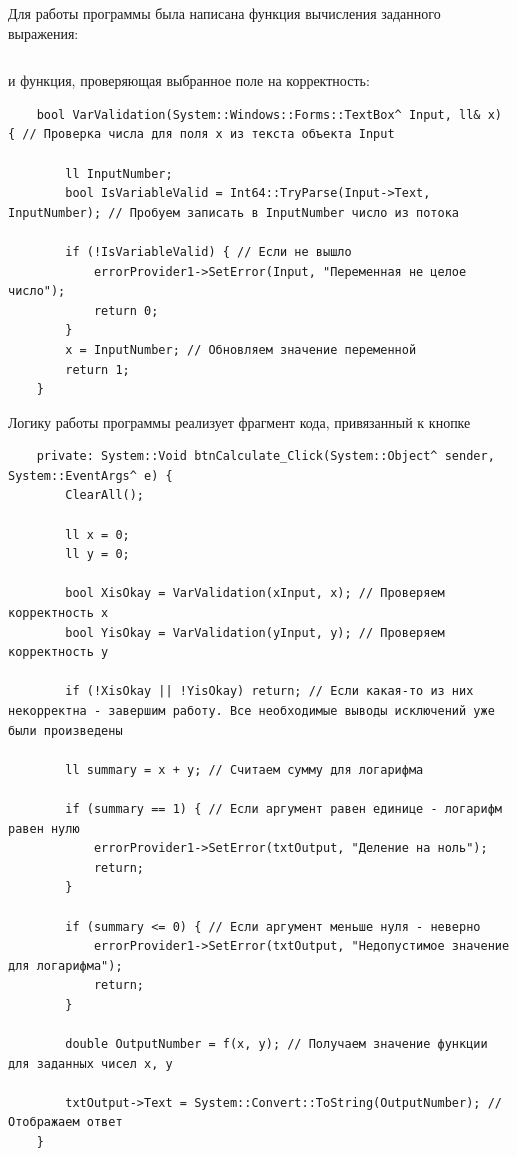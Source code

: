 Для работы программы была написана функция вычисления заданного выражения:
\inputminted[fontsize=\small, breaklines=true, style=bw, linenos]{cpp}{task2/f.h}
и функция, проверяющая выбранное поле на корректность\cite{MS, MS1}:
\begin{verbatim}
    bool VarValidation(System::Windows::Forms::TextBox^ Input, ll& x) { // Проверка числа для поля x из текста объекта Input
		
		ll InputNumber;
		bool IsVariableValid = Int64::TryParse(Input->Text, InputNumber); // Пробуем записать в InputNumber число из потока
		
		if (!IsVariableValid) { // Если не вышло
			errorProvider1->SetError(Input, "Переменная не целое число");
			return 0;
		}
		x = InputNumber; // Обновляем значение переменной
		return 1;
    }
\end{verbatim}
Логику работы программы реализует фрагмент кода, привязанный к кнопке
\begin{verbatim}
	private: System::Void btnCalculate_Click(System::Object^ sender, System::EventArgs^ e) {
		ClearAll();

		ll x = 0;
		ll y = 0;

		bool XisOkay = VarValidation(xInput, x); // Проверяем корректность x
		bool YisOkay = VarValidation(yInput, y); // Проверяем корректность y

		if (!XisOkay || !YisOkay) return; // Если какая-то из них некорректна - завершим работу. Все необходимые выводы исключений уже были произведены

		ll summary = x + y; // Считаем сумму для логарифма

		if (summary == 1) { // Если аргумент равен единице - логарифм равен нулю
			errorProvider1->SetError(txtOutput, "Деление на ноль");
			return;
		}

		if (summary <= 0) { // Если аргумент меньше нуля - неверно
			errorProvider1->SetError(txtOutput, "Недопустимое значение для логарифма");
			return;
		}

		double OutputNumber = f(x, y); // Получаем значение функции для заданных чисел х, у

		txtOutput->Text = System::Convert::ToString(OutputNumber); // Отображаем ответ
	}
\end{verbatim}

